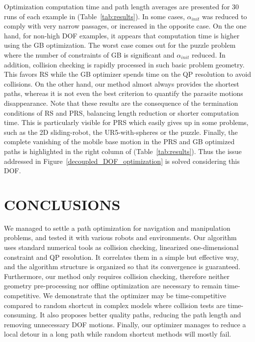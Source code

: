\documentclass{tADR2e}
\begin{document}
Optimization computation time and path length averages are presented for 30 runs of 
each example in (Table~\ref{tab:results}). In some cases, $\alpha_{init}$ was 
reduced to comply with very narrow passages, or increased in the opposite case. 
On the one hand, for non-high DOF examples, it appears that computation time is higher using the GB 
optimization. The worst case comes out for the puzzle problem where the number of 
constraints of GB is significant and $\alpha_{init}$ reduced. 
In addition, collision checking is rapidly processed in such basic problem geometry. This favors RS while the GB optimizer spends time on the QP resolution to avoid collisions.
On the other hand, our method almost always provides the shortest paths, whereas it 
is not even the best criterion to quantify the parasite motions disappearance.
Note that these results are the consequence of the termination conditions of RS and PRS, balancing length reduction or shorter computation time. 
This is particularly visible for PRS which 
easily gives up in some problems, such as the 2D sliding-robot, the 
UR5-with-spheres or the puzzle.
Finally, the complete vanishing of the mobile base motion in the PRS and GB 
optimized paths is highlighted in the right column of (Table~\ref{tab:results}). 
Thus the issue addressed in Figure~\ref{decoupled_DOF_optimization} is 
solved considering this DOF.



\section{CONCLUSIONS}
We managed to settle a path optimization for navigation and manipulation problems, and tested it with various robots and environments. Our algorithm uses standard 
numerical tools as collision checking, linearized one-dimensional constraint
and QP resolution. It correlates them in a 
simple but effective way, and the algorithm structure is organized so that its 
convergence is guaranteed. Furthermore, 
our method only requires collision checking, therefore neither 
geometry pre-processing nor 
offline optimization are necessary to remain time-competitive. We demonstrate 
that the optimizer may be 
time-competitive compared to random shortcut in complex models where collision tests 
are time-consuming. 
It also proposes better quality paths, reducing the path length and removing 
unnecessary DOF motions. 
Finally, our optimizer manages to reduce a local detour in a long path while random 
shortcut methods will mostly fail.
\end{document}
